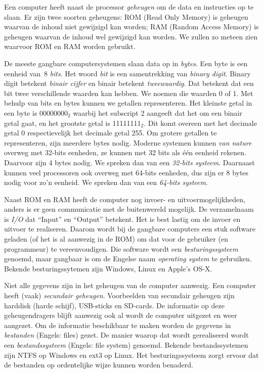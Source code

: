 Een computer heeft naast de processor \textsl{geheugen} om de data en instructies op te slaan. Er zijn twee soorten geheugens: ROM (Read Only Memory) is geheugen waarvan de inhoud niet gewijzigd kan worden; RAM (Random Access Memory) is geheugen waarvan de inhoud wel gewijzigd kan worden. We zullen zo meteen zien waarvoor ROM en RAM worden gebruikt.

\begin{infobox}
De meeste gangbare computersystemen slaan data op in \textsl{bytes}. Een byte is een eenheid van~8 \textsl{bits}. Het woord \textsl{bit} is een samentrekking van \textsl{binary digit}. Binary digit betekent \textsl{binair cijfer} en binair betekent \textsl{tweewaardig}. Dat betekent dat een bit twee verschillende waarden kan hebben. We noemen die waarden 0 of 1. Met behulp van bits en bytes kunnen we getallen representeren. Het kleinste getal in een byte is 00000000$_2$ waarbij het subscript 2 aangeeft dat het om een binair getal gaat, en het grootste getal is 11111111$_2$. Dit komt overeen met het decimale getal 0 respectievelijk het decimale getal 255. Om grotere getallen te representeren, zijn meerdere bytes nodig. Moderne systemen kunnen \textsl{van nature} overweg met 32-bits eenheden, ze kunnen met 32 bits als één eenheid rekenen. Daarvoor zijn 4 bytes nodig. We spreken dan van een \textsl{32-bits systeem}. Daarnaast kunnen veel processoren ook overweg met 64-bits eenheden, dus zijn er 8 bytes nodig voor zo'n eenheid. We spreken dan van een \textsl{64-bits systeem}.
\end{infobox}

Naast ROM en RAM heeft de computer nog invoer- en uitvoermogelijkheden, anders is er geen communicatie met de buitenwereld mogelijk. De verzamelnaam is \textsl{I/O} dat ``Input'' en ``Output'' betekent. Het is best lastig om de invoer en uitvoer te realiseren. Daarom wordt bij de gangbare computers een stuk software geladen (of het is al aanwezig in de ROM) om dat voor de gebruiker (en programmeur) te vereenvoudigen. Die software wordt een \textsl{besturingssysteem} genoemd, maar gangbaar is om de Engelse naam \textsl{operating system} te gebruiken. Bekende besturingssytemen zijn Windows, Linux en Apple's OS-X.

Niet alle gegevens zijn in het geheugen van de computer aanwezig. Een computer heeft (vaak) \textsl{secundair geheugen}. Voorbeelden van secundair geheugen zijn harddisk (harde schijf), USB-sticks en SD-cards. De informatie op deze geheugendragers blijft aanwezig ook al wordt de computer uitgezet en weer aangezet. Om de informatie beschikbaar te maken worden de gegevens in \textsl{bestanden} (Engels: files) gezet. De manier waarop dat wordt gerealiseerd wordt een \textsl{bestandssysteem} (Engels: file system) genoemd. Bekende bestandssystemen zijn NTFS op Windows en ext3 op Linux. Het besturingssysteem zorgt ervoor dat de bestanden op ordentelijke wijze kunnen worden benaderd.

